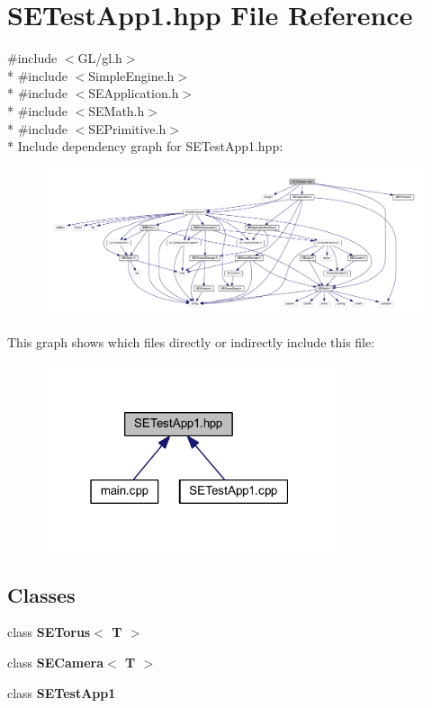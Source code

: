 \section{S\+E\+Test\+App1.\+hpp File Reference}
\label{_s_e_test_app1_8hpp}
{\ttfamily \#include $<$G\+L/gl.\+h$>$}\\*
{\ttfamily \#include $<$Simple\+Engine.\+h$>$}\\*
{\ttfamily \#include $<$S\+E\+Application.\+h$>$}\\*
{\ttfamily \#include $<$S\+E\+Math.\+h$>$}\\*
{\ttfamily \#include $<$S\+E\+Primitive.\+h$>$}\\*
Include dependency graph for S\+E\+Test\+App1.\+hpp\+:
\nopagebreak
\begin{figure}[H]
\begin{center}
\leavevmode
\includegraphics[width=350pt]{_s_e_test_app1_8hpp__incl}
\end{center}
\end{figure}
This graph shows which files directly or indirectly include this file\+:
\nopagebreak
\begin{figure}[H]
\begin{center}
\leavevmode
\includegraphics[width=244pt]{_s_e_test_app1_8hpp__dep__incl}
\end{center}
\end{figure}
\subsection*{Classes}
\begin{DoxyCompactItemize}
\item 
class {\bf S\+E\+Torus$<$ T $>$}
\item 
class {\bf S\+E\+Camera$<$ T $>$}
\item 
class {\bf S\+E\+Test\+App1}
\end{DoxyCompactItemize}
